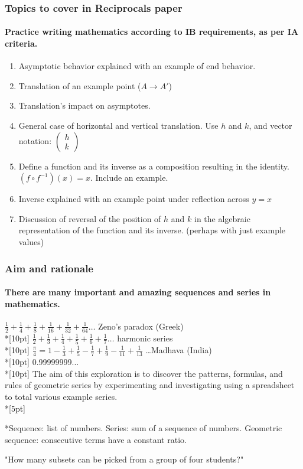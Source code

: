 \documentclass{beamer}
\begin{document}
 \frame
 {
   \frametitle{Topics to cover in Reciprocals paper}
   \framesubtitle{Practice writing mathematics according to IB requirements, as per IA criteria.}
 \begin{enumerate}
 \item Asymptotic behavior explained with an example of end behavior.
 \item Translation of an example point ($A \xrightarrow{} A'$)
 \item Translation's impact on asymptotes.
 \item General case of horizontal and vertical translation. Use $h$ and $k$, and vector notation: $\begin{pmatrix} h \\ k \end{pmatrix}$
 \item Define a function and its inverse as a composition resulting in the identity. $(f \circ f^{-1})(x)=x$. Include an example.
 \item Inverse explained with an example point under reflection across $y=x$
 \item Discussion of reversal of the position of $h$ and $k$ in the algebraic representation of the function and its inverse. (perhaps with just example values)
 \end{enumerate}
 }


 \frame
 {
   \frametitle{Aim and rationale}
   \framesubtitle{There are many important and amazing sequences and series in mathematics.}
   $\displaystyle \frac{1}{2}+\frac{1}{4}+\frac{1}{8}+\frac{1}{16}+\frac{1}{32}+\frac{1}{64} \dots$ Zeno's paradox (Greek)\\*[10pt]  $\displaystyle \frac{1}{2}+\frac{1}{3}+\frac{1}{4}+\frac{1}{5}+\frac{1}{6}+\frac{1}{7} \dots$ harmonic series\\*[10pt]
   $\displaystyle \frac{\pi}{4}=1-\frac{1}{3}+\frac{1}{5}-\frac{1}{7}+\frac{1}{9}-\frac{1}{11}+\frac{1}{13}$ \dots Madhava  (India)\\*[10pt]
   0.99999999...\\*[10pt]
 The aim of this exploration is to discover the patterns, formulas, and rules of geometric series by experimenting and investigating using a spreadsheet to total various example series.\\*[5pt]

 *Sequence: list of numbers. Series: sum of a sequence of numbers. Geometric sequence: consecutive terms have a constant ratio.
 }

"How many subsets can be picked from a group of four students?"

 
\end{document}

